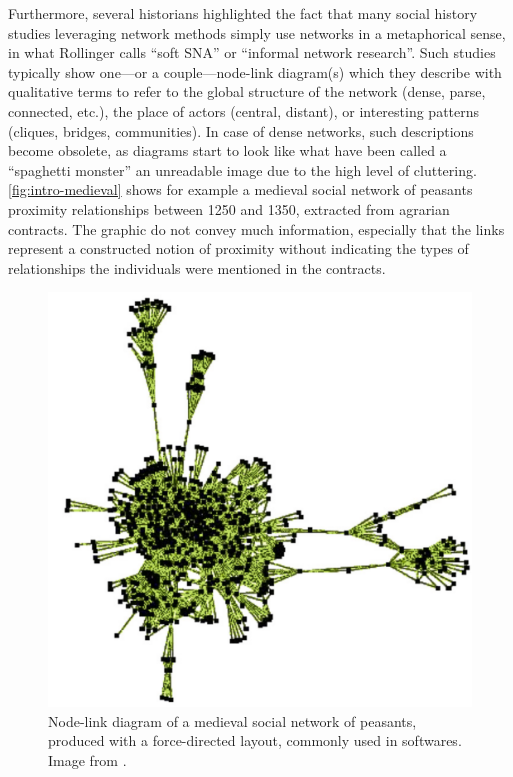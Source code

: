 Furthermore, several historians highlighted the fact that many social history studies leveraging network methods simply use networks in a metaphorical sense, in what Rollinger calls ``soft SNA'' or ``informal network research''\cite{rollingerProlegomenaProblemsPerspectives2020}.
Such studies typically show one---or a couple---node-link diagram(s) which they describe with qualitative terms\cite{lemercierQuantitativeMethodsHumanities2019} to refer to the global structure of the network (dense, parse, connected, etc.), the place of actors (central, distant), or interesting patterns (cliques, bridges, communities).
In case of dense networks, such descriptions become obsolete, as diagrams start to look like what have been called a ``spaghetti monster''\cite{collarNetworksArchaeologyPhenomena2015, lemercierQuantitativeMethodsHumanities2019} \ie an unreadable image due to the high level of cluttering.
\autoref{fig:intro-medieval} shows for example a medieval social network of peasants proximity relationships between 1250 and 1350, extracted from agrarian contracts.
The graphic do not convey much information, especially that the links represent a constructed notion of proximity without indicating the types of relationships the individuals were mentioned in the contracts.

\begin{figure}[!ht]
    \centering %
    \includegraphics[width=1\textwidth]{static/figures/RelatedWork/medievalNetwork}
    \caption{Node-link diagram of a medieval social network of peasants, produced with a force-directed layout, commonly used in \sna softwares. Image from \cite{bouletBatchKernelSOM2008}.}
    \label{fig:intro-medieval}
\end{figure}

